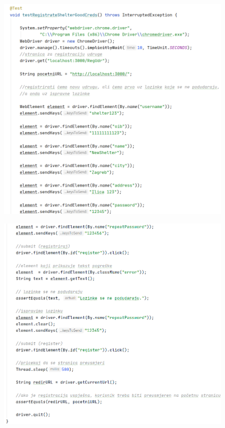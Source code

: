 			 \begin{figure}[H]
			 	\includegraphics[scale=0.75]{slike/Selenium3.1.PNG}
			 	\centering
			 \end{figure}
		 
			 \begin{figure}[H]
			 	\includegraphics[scale=0.75]{slike/Selenium3.2.PNG} %
			 	\centering
			 \end{figure}
			 

